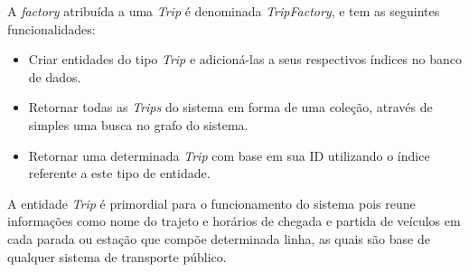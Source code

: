 A \emph{factory} atribuída a uma \emph{Trip} é denominada \emph{TripFactory}, e tem as seguintes funcionalidades:
\begin{itemize}
	\item Criar entidades do tipo \emph{Trip} e adicioná-las a seus respectivos índices no banco de dados.
	\item Retornar todas as \emph{Trips} do sistema em forma de uma coleção, através de simples uma busca no grafo do sistema.
	\item Retornar uma determinada \emph{Trip} com base em sua ID utilizando o índice referente a este tipo de entidade.
\end{itemize}

A entidade \emph{Trip} é primordial para o funcionamento do sistema pois reune informações como nome do trajeto e horários de chegada e partida de veículos em cada parada ou estação que compõe determinada linha, as quais são base de qualquer sistema de transporte público.


